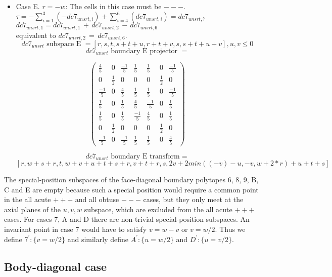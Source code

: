 \documentclass[preprint]{iucr}              %
\begin{document}
{\begin{itemize}
{ }
     \item{Case E. $r=-w$:  The cells in this case must be $---$.\\
     $\tau=-\sum_{i=1}^3(-dc7_{unsrt,i})+\sum_{i=4}^6(dc7_{unsrt,i}) = dc7_{unsrt,7}$\\
     $dc7_{unsrt,1}=dc7_{unsrt,1}\,+\,dc7_{unsrt,2}\,-\,dc7_{unsrt,6}$\\
          equivalent to
     $dc7_{unsrt,2}\,=\,dc7_{unsrt,6}$.
     \[dc7_{unsrt} \text{ subspace E } =[r,s,t,s+t+u,r+t+v,s,s+t+u+v], u, v \leq 0\]
     \[dc7_{unsrt} \text{ boundary E projector } =\]
\begin{center}
\begin{equation*}
\begin{pmatrix}
\frac{4}{5}&0&\frac{-1}{5}&\frac{1}{5}&\frac{1}{5}&0&\frac{-1}{5}\\[.25em]
0&\frac{1}{2}&0&0&0&\frac{1}{2}&0\\[.25em]
\frac{-1}{5}&0&\frac{4}{5}&\frac{1}{5}&\frac{1}{5}&0&\frac{-1}{5}\\[.25em]
\frac{1}{5}&0&\frac{1}{5}&\frac{4}{5}&\frac{-1}{5}&0&\frac{1}{5}\\[.25em]
\frac{1}{5}&0&\frac{1}{5}&\frac{-1}{5}&\frac{4}{5}&0&\frac{1}{5}\\[.25em]
0&\frac{1}{2}&0&0&0&\frac{1}{2}&0\\[.25em]
\frac{-1}{5}&0&\frac{-1}{5}&\frac{1}{5}&\frac{1}{5}&0&\frac{4}{5}
\end{pmatrix}
\end{equation*}
\end{center}


    \[dc7_{unsrt} \text{ boundary E transform}=\]
    \[[r,w+s+r,t,w+v+u+t+s+r,v+t+r,s,2v+2min((-v)-u,-v,w+2*r)+u+t+s]\]

     }
 \end{itemize}
 
 The special-position subspaces of the face-diagonal boundary polytopes 6, 8, 9, B, C and E are empty because such a
special position would require a common point in the all acute $+ + +$ and all obtuse $- - -$ cases, but they only meet
at the axial planes of the $u,v,w$ subspace, which are excluded from the all acute $+ + +$ cases.  For cases
7, A and D there are non-trivial special-position subspaces. 
An invariant point in case 7 would have to satisfy $v = w - v$ or $v = w/2$.
Thus we define $7^\prime\!: \{v = w/2\}$ and similarly define $A^\prime\!: \{u = w/2\}$ and $D^\prime\!: \{u = v/2\}$.

\subsection{Body-diagonal case}

}
\end{document}
